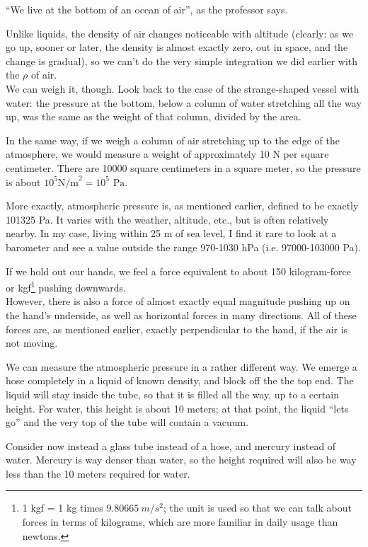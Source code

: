 ``We live at the bottom of an ocean of air'', as the professor says.

Unlike liquids, the density of air changes noticeable with altitude (clearly: as we go up, sooner or later, the density is almost exactly zero, out in space, and the change is gradual), so we can't do the very simple integration we did earlier with the $\rho$ of air.\\
We can weigh it, though. Look back to the case of the strange-shaped vessel with water: the pressure at the bottom, below a column of water stretching all the way up, was the same as the weight of that column, divided by the area.

In the same way, if we weigh a column of air stretching up to the edge of the atmosphere, we would measure a weight of approximately 10 N per square centimeter. There are 10000 square centimeters in a square meter, so the pressure is about $10^5 \text{N/m}^2 = 10^5 \text{ Pa}$.

More exactly, atmospheric pressure is, as mentioned earlier, defined to be exactly 101325 Pa. It varies with the weather, altitude, etc., but is often relatively nearby. In my case, living within 25 m of sea level, I find it rare to look at a barometer and see a value outside the range 970-1030 hPa (i.e. 97000-103000 Pa).

If we hold out our hands, we feel a force equivalent to about 150 kilogram-force or kgf\footnote{1 kgf = 1 kg times $\SI{9.80665}{m/s^2}$; the unit is used so that we can talk about forces in terms of kilograms, which are more familiar in daily usage than newtons.} pushing downwards.\\
However, there is also a force of almost exactly equal magnitude pushing up on the hand's underside, as well as horizontal forces in many directions. All of these forces are, as mentioned earlier, exactly perpendicular to the hand, if the air is not moving.

We can measure the atmospheric pressure in a rather different way. We emerge a hose completely in a liquid of known density, and block off the the top end. The liquid will stay inside the tube, so that it is filled all the way, up to a certain height. For water, this height is about 10 meters; at that point, the liquid ``lets go'' and the very top of the tube will contain a vacuum.

Consider now instead a glass tube instead of a hose, and mercury instead of water. Mercury is way denser than water, so the height required will also be way less than the 10 meters required for water.


